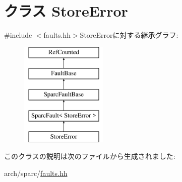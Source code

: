 \hypertarget{classSparcISA_1_1StoreError}{
\section{クラス StoreError}
\label{classSparcISA_1_1StoreError}
}


{\ttfamily \#include $<$faults.hh$>$}StoreErrorに対する継承グラフ:\begin{figure}[H]
\begin{center}
\leavevmode
\includegraphics[height=5cm]{classSparcISA_1_1StoreError}
\end{center}
\end{figure}


このクラスの説明は次のファイルから生成されました:\begin{DoxyCompactItemize}
\item 
arch/sparc/\hyperlink{arch_2sparc_2faults_8hh}{faults.hh}\end{DoxyCompactItemize}
